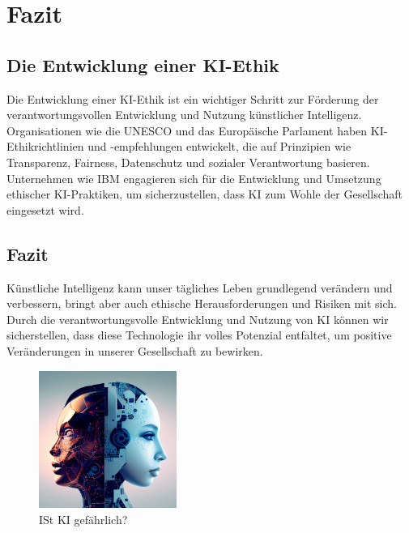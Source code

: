 \chapter{Fazit}
\section{Die Entwicklung einer KI-Ethik}
Die Entwicklung einer KI-Ethik ist ein wichtiger Schritt zur Förderung der verantwortungsvollen Entwicklung und Nutzung künstlicher Intelligenz. Organisationen wie die UNESCO und das Europäische Parlament haben KI-Ethikrichtlinien und -empfehlungen entwickelt, die auf Prinzipien wie Transparenz, Fairness, Datenschutz und sozialer Verantwortung basieren. Unternehmen wie IBM engagieren sich für die Entwicklung und Umsetzung ethischer KI-Praktiken, um sicherzustellen, dass KI zum Wohle der Gesellschaft eingesetzt wird.
\section{Fazit}
Künstliche Intelligenz kann unser tägliches Leben grundlegend verändern und verbessern, bringt aber auch ethische Herausforderungen und Risiken mit sich. Durch die verantwortungsvolle Entwicklung und Nutzung von KI können wir sicherstellen, dass diese Technologie ihr volles Potenzial entfaltet, um positive Veränderungen in unserer Gesellschaft zu bewirken.

\begin{figure}[h]
    \centering
    \includegraphics[width=0.4\textwidth]{KI bad good.jpg}
    \caption{ISt KI gefährlich?}
    \label{fig:ai2}
\end{figure}